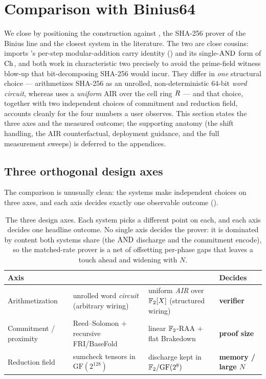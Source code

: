 \section{Comparison with Binius64}
\label{sec:cmp}

We close by positioning the construction against \binius{}
\cite{binius64repo}, the SHA-256 prover of the Binius line
\cite{binius,fribinius} and the closest system in the literature. The two are
close cousins: \zinc{} imports \binius{}'s per-step modular-addition carry
identity () and its single-$\operatorname{AND}$ form of $\operatorname{Ch}$, and both work
in characteristic two precisely to avoid the prime-field witness blow-up that
bit-decomposing SHA-256 would incur. They differ in \emph{one} structural
choice --- \binius{} arithmetizes SHA-256 as an unrolled, non-deterministic
$64$-bit \emph{word circuit}, whereas \zinc{} uses a \emph{uniform} AIR over
the cell ring $R$ --- and that choice, together with two independent
choices of commitment and reduction field, accounts cleanly for the four
numbers a user observes. This section states the three axes and the measured
outcome; the supporting anatomy (the shift handling, the AIR counterfactual,
deployment guidance, and the full measurement sweeps) is deferred to the
appendices.

\subsection{Three orthogonal design axes}
\label{sec:axes}

The comparison is unusually clean: the systems make independent choices on
three axes, and each axis decides exactly one observable outcome
().

\begin{table}[t]
\centering
\renewcommand{\arraystretch}{1.25}
\begin{tabularx}{\textwidth}{@{}lXXl@{}}
\toprule
\textbf{Axis} & \textbf{\binius{}} & \textbf{\zinc{}} & \textbf{Decides} \\
\midrule
Arithmetization &
  unrolled word \emph{circuit} (arbitrary wiring) &
  uniform \emph{AIR} over $\mathbb{F}_2[X]$ (structured wiring) &
  \textbf{verifier} \\
Commitment / proximity &
  Reed--Solomon $+$ recursive FRI/BaseFold &
  linear $\mathbb{F}_2$-RAA $+$ flat Brakedown &
  \textbf{proof size} \\
Reduction field &
  sumcheck tensors in $\mathrm{GF}(2^{128})$ &
  discharge kept in $\mathbb{F}_2/\mathrm{GF}(2^8)$ &
  \textbf{memory / large $N$} \\
\bottomrule
\end{tabularx}
\caption{The three design axes. Each system picks a different point on each,
and each axis decides one headline outcome. No single axis decides the prover:
it is dominated by content both systems share (the $\operatorname{AND}$ discharge and the
commitment encode), so the matched-rate prover is a net of offsetting per-phase
gaps that leaves \zinc{} a touch ahead and widening with $N$.}
\label{tab:axes}
\end{table}

